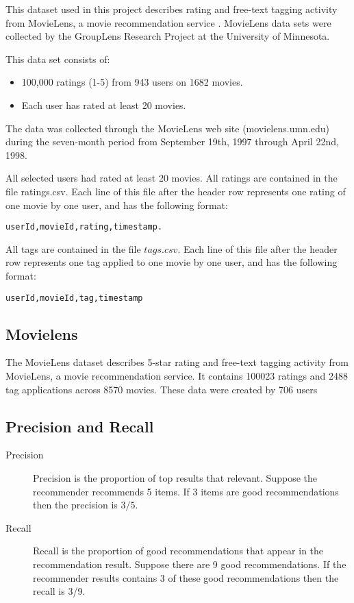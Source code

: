 \documentclass[twoside,a4paper]{article}
\begin{document}
This dataset used in this project describes rating and free-text tagging activity from MovieLens, a movie recommendation service \cite{movielensdata}.
MovieLens data sets were collected by the GroupLens Research Project at the University of Minnesota.
 
This data set consists of:
\begin{itemize}
\item 100,000 ratings (1-5) from 943 users on 1682 movies. 
\item Each user has rated at least 20 movies. 
\end{itemize}

The data was collected through the MovieLens web site (movielens.umn.edu) during the seven-month period from September 19th, 
1997 through April 22nd, 1998.

All selected users had rated at least 20 movies.
All ratings are contained in the file ratings.csv. Each line of this file after the header row represents one rating of one movie by one user, and has the following format:

\begin{verbatim}
userId,movieId,rating,timestamp.
\end{verbatim}

All tags are contained in the file $tags.csv$. Each line of this file after the header row represents one tag applied to one movie by one user, and has the following format:
\begin{verbatim}
userId,movieId,tag,timestamp
\end{verbatim}

\subsection{Movielens}
\label{sec:movielens}

The MovieLens dataset describes 5-star rating and free-text tagging activity from MovieLens, a movie recommendation service. It contains 100023 ratings and 2488 tag applications across 8570 movies. These data were created by 706 users 


\subsection{Precision and Recall}
\label{sec:precision}


\begin{description}
\item[Precision] Precision is the proportion of top results that relevant. Suppose the recommender recommends 5 items. If 3 items are good recommendations then the precision is $3/5$.
\item[Recall] Recall is the proportion of good recommendations that appear in the recommendation result. Suppose there are 9 good recommendations. If the recommender results contains 3 of these good recommendations then the recall is 3/9.
\end{description}
\end{document}
